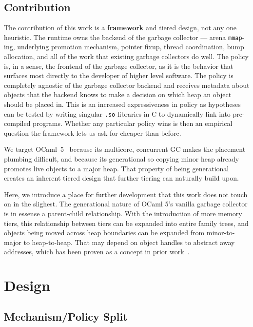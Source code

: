 \documentclass[sigconf]{acmart}
\begin{document}
\subsection{Contribution}

The contribution of this work is a \textbf{framework} and tiered design, not any one heuristic.
The runtime owns the backend of the garbage collector --- arena \texttt{mmap}-ing, underlying promotion mechanism, pointer fixup,
thread coordination, bump allocation, and all of the work that existing garbage collectors do well.
The policy is, in a sense, the frontend of the garbage collector, as it is the behavior that surfaces most directly
to the developer of higher level software. The policy is completely agnostic of the garbage collector backend and receives
metadata about objects that the backend knows to make a decision on which heap an object should be placed in. This is an increased expressiveness in policy
as hypotheses can be tested by writing singular \texttt{.so} libraries in C to dynamically link into pre-compiled programs. Whether any particular
policy wins is then an empirical question the framework lets us ask for cheaper than before.

We target OCaml~5~\cite{ocaml5gc2020} because its multicore, concurrent GC makes
the placement plumbing difficult, and because its generational so copying minor heap
already promotes live objects to a major heap. That property of being generational creates an inherent tiered design that
further tiering can naturally build upon.

Here, we introduce a place for further development that this work does not touch on in the slighest. The generational nature of OCaml 5's vanilla garbage collector is in essense a parent-child relationship. With the introduction of more memory tiers, this relationship between tiers can be expanded into entire family trees, and objects being moved across heap boundaries can be expanded from minor-to-major to heap-to-heap. That may depend on object handles to abstract away addresses, which has been proven as a concept in prior work~\cite{alaska2024}.

\section{Design}

\subsection{Mechanism/Policy Split}
\end{document}

